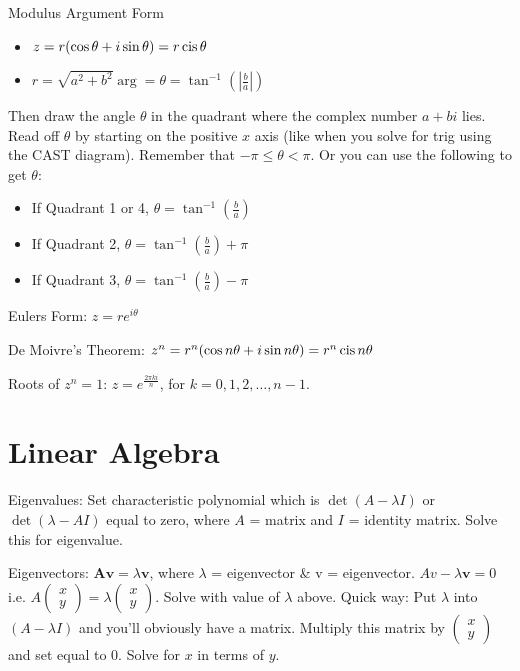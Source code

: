 \documentclass[10pt,a4paper,oneside]{book}
\begin{document}
Modulus Argument Form 
\begin{itemize}
    \item $z=r(\cos\theta + i\sin\theta)=r\operatorname{cis} \theta$
    \item $r=\sqrt{a^2+b^2}\arg = \theta = \tan^{-1}\left(\left|\frac{b}{a}\right|\right)$
\end{itemize}
Then draw the angle $\theta$ in the quadrant where the complex number $a+bi$ lies. Read off $\theta$ by starting on the positive $x$ axis (like when you solve for trig using the CAST diagram).
Remember that $-\pi \leq \theta < \pi$. Or you can use the following to get $\theta$:
\begin{itemize}
    \item If Quadrant 1 or 4, $\theta = \tan^{-1}\left(\frac{b}{a}\right)$
    \item If Quadrant 2, $\theta = \tan^{-1}\left(\frac{b}{a}\right)+\pi$
    \item If Quadrant 3, $\theta = \tan^{-1}\left(\frac{b}{a}\right)-\pi$
\end{itemize}

Eulers Form: $z=re^{i\theta}$

De Moivre's Theorem: $z^n=r^n(\cos n\theta + i\sin n\theta)=r^n \operatorname{cis} n\theta$

Roots of $z^n=1$: $z=e^{\frac{2\pi ki}{n}}$, for $k=0,1,2,\dots,n-1$.

\section*{Linear Algebra}
Eigenvalues: Set characteristic polynomial which is $\det(A-\lambda I)$ or $\det(\lambda-AI)$ equal to zero, where $A$ = matrix and $I$ = identity matrix. Solve this for eigenvalue.

Eigenvectors: $\textbf{Av}=\lambda\textbf{v}$, where $\lambda$ = eigenvector \& $\text{v}$ = eigenvector. $Av-\lambda\textbf{v}=0$ i.e. $A\begin{pmatrix}
    x\\y
\end{pmatrix} =\lambda\begin{pmatrix}
    x\\y
\end{pmatrix}$. Solve with value of $\lambda$ above. Quick way: Put $\lambda$ into $(A-\lambda I)$ and you'll obviously have a matrix. Multiply this matrix by $\begin{pmatrix}
    x \\ y
\end{pmatrix}$ and set equal to 0. Solve for $x$ in terms of $y$.
\end{document}
